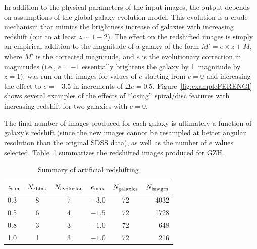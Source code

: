 \documentclass[twocolumn]{aastex6}
\begin{document}
In addition to the physical parameters of the input images, the \ferengi{}
output depends on assumptions of the global galaxy evolution model. This
evolution is a crude mechanism that mimics the brightness increase of galaxies
with increasing redshift (out to at least $z\sim1-2$). The effect on the
redshifted images is simply an empirical addition to the magnitude of a galaxy
of the form $M' = e\times z + M$, where $M'$ is the corrected magnitude, and
$e$ is the evolutionary correction in magnitudes (i.e., $e=-1$ essentially
brightens the galaxy by 1~magnitude by $z=1$). \ferengi{} was run on the images
for values of $e$ starting from $e=0$ and increasing the effect to $e=-3.5$ in
increments of $\Delta e = 0.5$. Figure~\ref{fig:exampleFERENGI} shows
several examples of the effects of ``losing'' spiral/disc features with
increasing redshift for two galaxies with $e=0$. 

The final number of \ferengi{} images produced for each galaxy is ultimately a
function of galaxy's redshift (since the new images cannot be resampled at
better angular resolution than the original SDSS data), as well as the number
of $e$ values selected. Table~\ref{tbl:ferengivalues} summarizes the redshifted
images produced for GZH. 

\begin{table}
\caption{Summary of \ferengi{} artificial redshifting \label{tbl:ferengivalues}}
\begin{tabular}{lccccr}
\hline\hline
$z_{\rm sim}$ & $N_{z {\rm bins}}$ & $N_{\rm evolution}$ & $e_{\rm max}$ & $N_{\rm galaxies}$ & $N_{\rm images}$\\
\hline
0.3              & 8                  & 7                   & $-3.0$        & 72             & 4032 \\
0.5              & 6                  & 4                   & $-1.5$        & 72             & 1728 \\
0.8              & 3                  & 3                   & $-1.0$        & 72             &  648 \\
1.0              & 1                  & 3                   & $-1.0$        & 72             &  216 \\
\hline\hline
\end{tabular}
\end{table}
\end{document}
